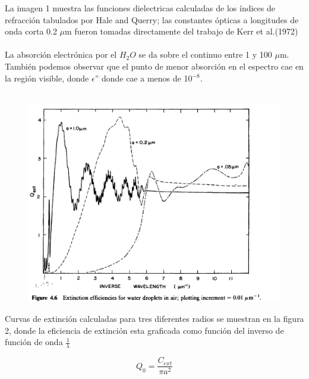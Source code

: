 \documentclass[11pt]{article}
\begin{document}
La imagen 1 muestra las funciones dielectricas calculadas de los índices de refracción tabulados por Hale and Querry; las constantes ópticas a longitudes de onda corta 0.2 $\mu$m fueron tomadas directamente del trabajo de Kerr et al.(1972)
\\ \\
La absorción electrónica por el $H_{2}O$ se da sobre el continuo entre 1 y 100 $\mu$m. También podemos observar que el punto de menor absorción en el espectro cae en la región visible, donde $\epsilon$'' donde cae a menos de 10$^{-8}$.
\\ \\

\begin{figure}[H]
\centering
\includegraphics[scale=0.5]{2.png}
\label{fig:p0}
\end{figure}

Curvas de extinción calculadas para tres diferentes radios se muestran en la figura 2, donde la eficiencia de extinción esta graficada como función del inverso de función de onda $\frac{1}{\lambda}$

\begin{equation}
    Q_{0} = \frac{C_{ext}}{\pi a^{2}}
\end{equation}
\end{document}

